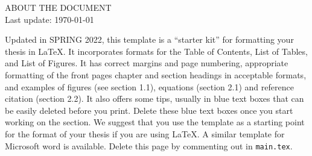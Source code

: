 
\begin{tcolorbox}[width=\textwidth,colback={blue},outer arc=0mm,colupper=white]
\begin{center}
    \LARGE{ABOUT THE DOCUMENT}\\
    \normalsize Last update: \today
\end{center} 
    Updated in SPRING 2022, this template is a “starter kit” for formatting your thesis in \LaTeX.  It incorporates formats for the Table of Contents, List of Tables, and List of Figures. It has correct margins and page numbering, appropriate formatting of the front pages chapter and section headings in acceptable formats, and examples of figures (see section 1.1), equations (section 2.1) and reference citation (section 2.2). It also offers some tips, usually in blue text boxes that can be easily deleted before you print. Delete these blue text boxes once you start working on the section. We suggest that you use the template as a starting point for the format of your thesis if you are using \LaTeX. A similar template for Microsoft word is available. Delete this page by commenting out \verb++ in \verb+main.tex+.
\end{tcolorbox}

\thispagestyle{empty}


